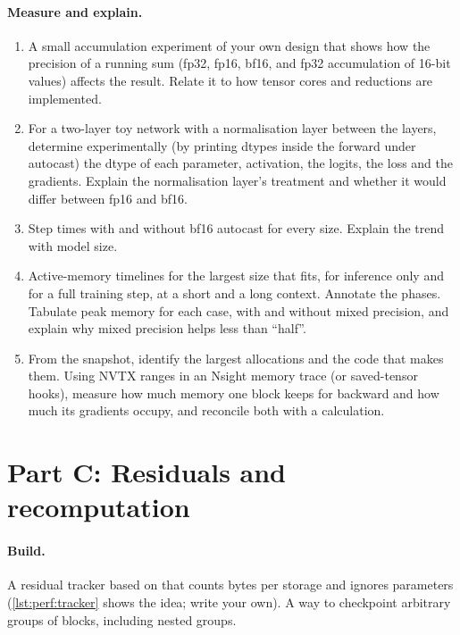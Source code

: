 \paragraph{Measure and explain.}
\begin{enumerate}
\item A small accumulation experiment of your own design that shows how the precision of a
  running sum (fp32, fp16, bf16, and fp32 accumulation of 16-bit values) affects the result. Relate
  it to how tensor cores and reductions are implemented.
\item For a two-layer toy network with a normalisation layer between the layers, determine
  experimentally (by printing dtypes inside the forward under autocast) the dtype of each parameter,
  activation, the logits, the loss and the gradients. Explain the normalisation layer's treatment and
  whether it would differ between fp16 and bf16.
\item Step times with and without bf16 autocast for every size. Explain the trend with model size.
\item Active-memory timelines for the largest size that fits, for inference only and for a full
  training step, at a short and a long context. Annotate the phases. Tabulate peak memory for each
  case, with and without mixed precision, and explain why mixed precision helps less than ``half''.
\item From the snapshot, identify the largest allocations and the code that makes them. Using NVTX
  ranges in an Nsight memory trace (or saved-tensor hooks), measure how much memory one block keeps
  for backward and how much its gradients occupy, and reconcile both with a calculation.
\end{enumerate}

\section{Part C: Residuals and recomputation}\label{sec:proj2:c}

\paragraph{Build.} A residual tracker based on  that counts bytes per
storage and ignores parameters (\cref{lst:perf:tracker} shows the idea; write your own). A way to
checkpoint arbitrary groups of blocks, including nested groups.

